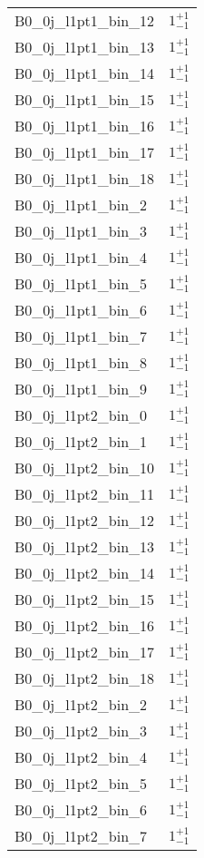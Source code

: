 \begin{tabular}{|l|c|}
B0\_0j\_l1pt1\_bin\_12 & $1^{+1}_{-1}$ \\
B0\_0j\_l1pt1\_bin\_13 & $1^{+1}_{-1}$ \\
B0\_0j\_l1pt1\_bin\_14 & $1^{+1}_{-1}$ \\
B0\_0j\_l1pt1\_bin\_15 & $1^{+1}_{-1}$ \\
B0\_0j\_l1pt1\_bin\_16 & $1^{+1}_{-1}$ \\
B0\_0j\_l1pt1\_bin\_17 & $1^{+1}_{-1}$ \\
B0\_0j\_l1pt1\_bin\_18 & $1^{+1}_{-1}$ \\
B0\_0j\_l1pt1\_bin\_2 & $1^{+1}_{-1}$ \\
B0\_0j\_l1pt1\_bin\_3 & $1^{+1}_{-1}$ \\
B0\_0j\_l1pt1\_bin\_4 & $1^{+1}_{-1}$ \\
B0\_0j\_l1pt1\_bin\_5 & $1^{+1}_{-1}$ \\
B0\_0j\_l1pt1\_bin\_6 & $1^{+1}_{-1}$ \\
B0\_0j\_l1pt1\_bin\_7 & $1^{+1}_{-1}$ \\
B0\_0j\_l1pt1\_bin\_8 & $1^{+1}_{-1}$ \\
B0\_0j\_l1pt1\_bin\_9 & $1^{+1}_{-1}$ \\
B0\_0j\_l1pt2\_bin\_0 & $1^{+1}_{-1}$ \\
B0\_0j\_l1pt2\_bin\_1 & $1^{+1}_{-1}$ \\
B0\_0j\_l1pt2\_bin\_10 & $1^{+1}_{-1}$ \\
B0\_0j\_l1pt2\_bin\_11 & $1^{+1}_{-1}$ \\
B0\_0j\_l1pt2\_bin\_12 & $1^{+1}_{-1}$ \\
B0\_0j\_l1pt2\_bin\_13 & $1^{+1}_{-1}$ \\
B0\_0j\_l1pt2\_bin\_14 & $1^{+1}_{-1}$ \\
B0\_0j\_l1pt2\_bin\_15 & $1^{+1}_{-1}$ \\
B0\_0j\_l1pt2\_bin\_16 & $1^{+1}_{-1}$ \\
B0\_0j\_l1pt2\_bin\_17 & $1^{+1}_{-1}$ \\
B0\_0j\_l1pt2\_bin\_18 & $1^{+1}_{-1}$ \\
B0\_0j\_l1pt2\_bin\_2 & $1^{+1}_{-1}$ \\
B0\_0j\_l1pt2\_bin\_3 & $1^{+1}_{-1}$ \\
B0\_0j\_l1pt2\_bin\_4 & $1^{+1}_{-1}$ \\
B0\_0j\_l1pt2\_bin\_5 & $1^{+1}_{-1}$ \\
B0\_0j\_l1pt2\_bin\_6 & $1^{+1}_{-1}$ \\
B0\_0j\_l1pt2\_bin\_7 & $1^{+1}_{-1}$ \\

\end{tabular}
